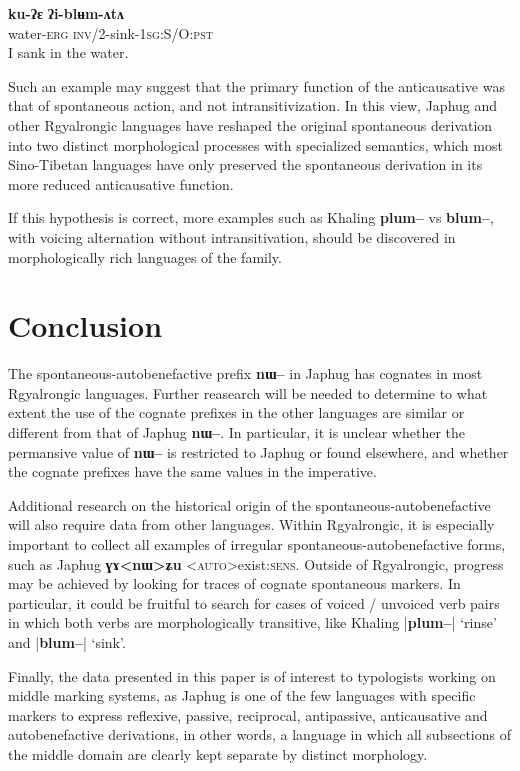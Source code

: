 \documentclass[oldfontcommands,oneside,a4paper,11pt]{article}
\newcommand{\ipa}[1]{\textbf{{\phon\mbox{#1}}}} %
\begin{document}
\begin{exe}
\ex \label{ex:iblumata}
\gll
\ipa{ku-ʔɛ} \ipa{ʔi-blʉm-ʌtʌ} \\
water-\textsc{erg} \textsc{inv/2}-sink-\textsc{1sg:S/O:pst}\\
\glt I sank in the water.
\end{exe}

Such an example may suggest that the primary function of the anticausative was that of spontaneous action, and not intransitivization. In this view, Japhug and other Rgyalrongic languages have reshaped the original spontaneous derivation into two distinct morphological processes with specialized semantics, which most Sino-Tibetan languages have only preserved the spontaneous derivation in its more reduced anticausative function. 

If this hypothesis is correct, more examples such as Khaling \ipa{plum--} vs \ipa{blum--}, with voicing alternation without intransitivation, should be discovered in morphologically rich languages of the family.

\section{Conclusion}
The spontaneous-autobenefactive prefix \ipa{nɯ--} in Japhug has cognates in most Rgyalrongic languages. Further reasearch will be needed to determine to what extent the use of the cognate prefixes in the other languages are similar or different from that of Japhug \ipa{nɯ--}. In particular, it is unclear whether the permansive value of \ipa{nɯ--} is restricted to Japhug or found elsewhere, and whether the cognate prefixes have the same values in the imperative.

Additional research on the historical origin of the spontaneous-autobenefactive will also require data from other languages. Within Rgyalrongic, it is especially important to collect all examples of irregular spontaneous-autobenefactive forms, such as Japhug \ipa{ɣɤ<nɯ>ʑu} <\textsc{auto}>exist:\textsc{sens}. Outside of Rgyalrongic, progress may be achieved by looking for traces of cognate spontaneous markers. In particular, it could be fruitful to search for cases of voiced / unvoiced verb pairs in which both verbs are morphologically transitive, like Khaling |\ipa{plum--}| `rinse' and |\ipa{blum--}| `sink'.

Finally, the data presented in this paper is of interest to typologists working on middle marking systems, as Japhug is one of the few languages with specific markers to express reflexive, passive, reciprocal, antipassive, anticausative and autobenefactive derivations, in other words, a language in which all subsections of the middle domain are clearly kept separate by distinct morphology.




 
\end{document}

